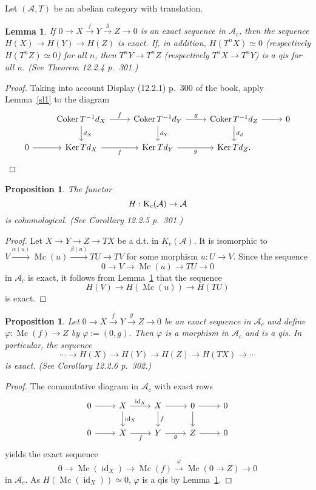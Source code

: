 \documentclass[12pt]{article}
\newtheorem{lem}[thm]{Lemma}
\newtheorem{prop}[thm]{Proposition}
\theoremstyle{remark}
\theoremstyle{definition}
\newcommand{\A}{\mathcal A}
\newcommand{\xr}{\xrightarrow}
\DeclareMathOperator{\Coker}{Coker}
\DeclareMathOperator{\id}{id}
\DeclareMathOperator{\Ker}{Ker}
\DeclareMathOperator{\Mc}{Mc}
\begin{document}
Let $(\A,T)$ be an abelian category with translation. 
%
\begin{lem}\label{sl2}
If $0\to X\xr fY\xr g Z\to0$ is an exact sequence in $\A_c$, then the sequence $H(X)\to H(Y)\to H(Z)$ is exact. If, in addition, $H(T^nX)\simeq0$ (respectively $H(T^nZ)\simeq0$) for all $n$, then $T^nY\to T^nZ$ (respectively $T^nX\to T^nY$) is a qis for all $n$. (See Theorem 12.2.4 p.~301.)
\end{lem}
%
\begin{proof}
Taking into account Display (12.2.1) p.~300 of the book, apply Lemma~\ref{sl1} to the diagram 
$$
\begin{tikzcd}
{}&\Coker T^{-1}d_X\ar{d}{d_X}\ar{r}{f}&\Coker T^{-1}d_Y\ar{d}{d_Y}\ar{r}{g}&\Coker T^{-1}d_Z\ar{d}{d_Z}\ar{r}&0\\ 
0\ar{r}&\Ker Td_X\ar{r}[swap]{f}&\Ker Td_Y\ar{r}[swap]{g}&\Ker Td_Z.
\end{tikzcd}
$$ 
\end{proof}
%
\begin{prop}\label{sl3}
The functor 
$$
H:\text K_c(\A)\to\A
$$ 
is cohomological. (See Corollary 12.2.5 p.~301.) 
\end{prop}
%
\begin{proof}
Let $X\to Y\to Z\to TX$ be a d.t. in $K_c(\A)$. It is isomorphic to $V\xr{\alpha(u)}\Mc(u)\xr{\beta(u)}TU\to TV$ for some morphism $u:U\to V$. Since the sequence 
$$
0\to V\to\Mc(u)\to TU\to0
$$ 
in $\A_c$ is exact, it follows from Lemma~\ref{sl2} that the sequence 
$$ 
H(V)\to H(\Mc(u))\to H(TU)
$$ 
is exact.
\end{proof}
%
\begin{prop}\label{sl4}
Let $0\to X\xr f Y\xr g Z\to0$ be an exact sequence in $\A_c$ and define $\varphi:\Mc(f)\to Z$ by $\varphi:=(0,g)$. Then $\varphi$ is a morphism in $\A_c$ and is a qis. In particular, the sequence 
$$
\cdots\to H(X)\to H(Y)\to H(Z)\to H(TX)\to\cdots
$$
is exact. (See Corollary 12.2.6 p.~302.)
\end{prop}
%
\begin{proof}
The commutative diagram in $\A_c$ with exact rows 
$$
\begin{tikzcd}
0\ar{r}&X\ar{d}{\id_X}\ar{r}{\id_X}&X\ar{d}{f}\ar{r}&0\ar{d}\ar{r}&0\\ 
0\ar{r}&X\ar{r}[swap]{f}&Y\ar{r}[swap]{g}&Z\ar{r}&0
\end{tikzcd}
$$ 
yields the exact sequence 
$$
0\to\Mc(\id_X)\to\Mc(f)\xr\varphi\Mc(0\to Z)\to0
$$
in $\A_c$. As $H(\Mc(\id_X))\simeq0$, $\varphi$ is a qis by Lemma~\ref{sl2}.
\end{proof}
%
\newpage
\end{document}

